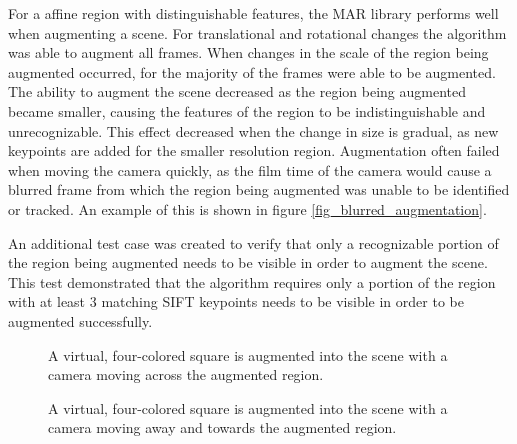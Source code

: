 \documentclass[oneside,11pt]{Latex/Classes/PhDthesisPSnPDF}
\begin{document}
For a affine region with distinguishable features, the MAR library performs well when augmenting a scene.  For translational and rotational changes the algorithm was able to augment all frames.  When changes in the scale of the region being augmented occurred, for the majority of the frames were able to be augmented.  The ability to augment the scene decreased as the region being augmented became smaller, causing the features of the region to be indistinguishable and unrecognizable.  This effect decreased when the change in size is gradual, as new keypoints are added for the smaller resolution region.  Augmentation often failed when moving the camera quickly, as the film time of the camera would cause a blurred frame from which the region being augmented was unable to be identified or tracked.  An example of this is shown in figure \ref{fig_blurred_augmentation}.

An additional test case was created to verify that only a recognizable portion of the region being augmented needs to be visible in order to augment the scene.  This test demonstrated that the algorithm requires only a portion of the region with at least 3 matching SIFT keypoints needs to be visible in order to be augmented successfully.

\begin{figure}[h!]
  \caption{\label{fig_translation_augmentation} A virtual, four-colored square is augmented into the scene with a camera moving across the augmented region.}
\end{figure}

\begin{figure}[h!]
  \caption{\label{fig_scaling_augmentation} A virtual, four-colored square is augmented into the scene with a camera moving away and towards the augmented region.}
\end{figure}
\end{document}
